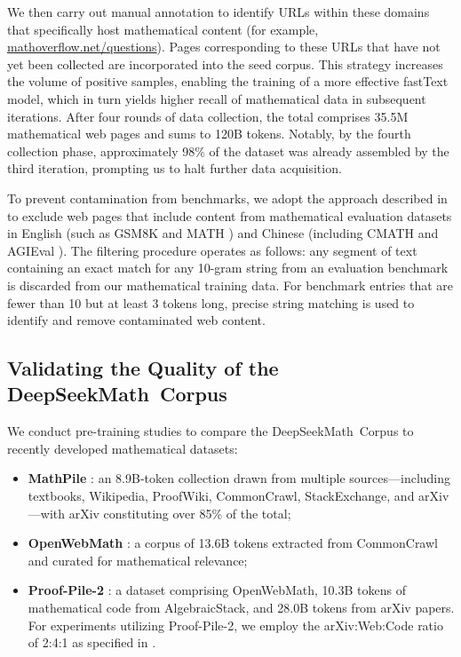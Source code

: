 We then carry out manual annotation to identify URLs within these domains that specifically host mathematical content (for example, \url{mathoverflow.net/questions}). Pages corresponding to these URLs that have not yet been collected are incorporated into the seed corpus. This strategy increases the volume of positive samples, enabling the training of a more effective fastText model, which in turn yields higher recall of mathematical data in subsequent iterations. After four rounds of data collection, the total comprises 35.5M mathematical web pages and sums to 120B tokens. Notably, by the fourth collection phase, approximately 98\% of the dataset was already assembled by the third iteration, prompting us to halt further data acquisition.

To prevent contamination from benchmarks, we adopt the approach described in \cite{deepseek-coder} to exclude web pages that include content from mathematical evaluation datasets in English (such as GSM8K \citep{gsm8k} and MATH \citep{MATH}) and Chinese (including CMATH \citep{wei2023cmath} and AGIEval \citep{agieval}). The filtering procedure operates as follows: any segment of text containing an exact match for any 10-gram string from an evaluation benchmark is discarded from our mathematical training data. For benchmark entries that are fewer than 10 but at least 3 tokens long, precise string matching is used to identify and remove contaminated web content.

\subsection{Validating the Quality of the DeepSeekMath~Corpus}

We conduct pre-training studies to compare the DeepSeekMath~Corpus to recently developed mathematical datasets:

\begin{itemize}[topsep=0pt]
    \item \textbf{MathPile} \citep{mathpile}: an 8.9B-token collection drawn from multiple sources—including textbooks, Wikipedia, ProofWiki, CommonCrawl, StackExchange, and arXiv—with arXiv constituting over 85\% of the total;
    \item \textbf{OpenWebMath} \citep{openwebmath}: a corpus of 13.6B tokens extracted from CommonCrawl and curated for mathematical relevance;
    \item \textbf{Proof-Pile-2} \citep{llemma}: a dataset comprising OpenWebMath, 10.3B tokens of mathematical code from AlgebraicStack, and 28.0B tokens from arXiv papers. For experiments utilizing Proof-Pile-2, we employ the arXiv:Web:Code ratio of 2:4:1 as specified in \cite{llemma}.
\end{itemize}

